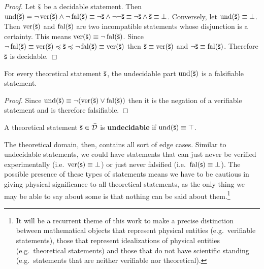 \documentclass[11pt,letterpaper,fleqn]{memoir} %
\begin{document}
\begin{mathSection}
\begin{proof}
	Let $\bar{\mathsf{s}}$ be a decidable statement. Then $\operatorname{und}(\bar{\mathsf{s}}) = \neg \operatorname{ver}(\bar{\mathsf{s}}) \wedge \neg \operatorname{fal}(\bar{\mathsf{s}}) \equiv \neg \bar{\mathsf{s}} \wedge \neg \neg \bar{\mathsf{s}} \equiv \neg \bar{\mathsf{s}} \wedge \bar{\mathsf{s}} \equiv \bot$. Conversely, let $\operatorname{und}(\bar{\mathsf{s}}) \equiv \bot$. Then $\operatorname{ver}(\bar{\mathsf{s}})$ and $\operatorname{fal}(\bar{\mathsf{s}})$ are two incompatible statements whose disjunction is a certainty. This means $\operatorname{ver}(\bar{\mathsf{s}}) \equiv \neg \operatorname{fal}(\bar{\mathsf{s}})$. Since $\neg \operatorname{fal}(\bar{\mathsf{s}}) \equiv \operatorname{ver}(\bar{\mathsf{s}}) \preccurlyeq \bar{\mathsf{s}} \preccurlyeq \neg \operatorname{fal}(\bar{\mathsf{s}}) \equiv \operatorname{ver}(\bar{\mathsf{s}})$ then $\bar{\mathsf{s}} \equiv \operatorname{ver}(\bar{\mathsf{s}})$ and $\neg\bar{\mathsf{s}} \equiv \operatorname{fal}(\bar{\mathsf{s}})$. Therefore $\bar{\mathsf{s}}$ is decidable.	
\end{proof}

\begin{coro}
	For every theoretical statement $\bar{\mathsf{s}}$, the undecidable part $\operatorname{und}(\bar{\mathsf{s}})$ is a falsifiable statement.
\end{coro}

\begin{proof}
	Since $\operatorname{und}(\bar{\mathsf{s}}) \equiv \neg (\operatorname{ver}(\bar{\mathsf{s}}) \vee \operatorname{fal}(\bar{\mathsf{s}}))$ then it is the negation of a verifiable statement and is therefore falsifiable.
\end{proof}

\begin{defn}
	A theoretical statement $\bar{\mathsf{s}} \in \bar{\mathcal{D}}$ is \textbf{undecidable} if $\operatorname{und}(\bar{\mathsf{s}}) \equiv \top$.
\end{defn}
\end{mathSection}

The theoretical domain, then, contains all sort of edge cases. Similar to undecidable statements, we could have statements that can just never be verified experimentally (i.e.~$\operatorname{ver}(\mathsf{s}) \equiv \bot$) or just never falsified (i.e.~$\operatorname{fal}(\mathsf{s}) \equiv \bot$). The possible presence of these types of statements means we have to be cautious in giving physical significance to all theoretical statements, as the only thing we may be able to say about some is that nothing can be said about them.\footnote{It will be a recurrent theme of this work to make a precise distinction between mathematical objects that represent physical entities (e.g.~verifiable statements), those that represent idealizations of physical entities (e.g.~theoretical statements) and those that do not have scientific standing (e.g.~statements that are neither verifiable nor theoretical).}
\end{document}
